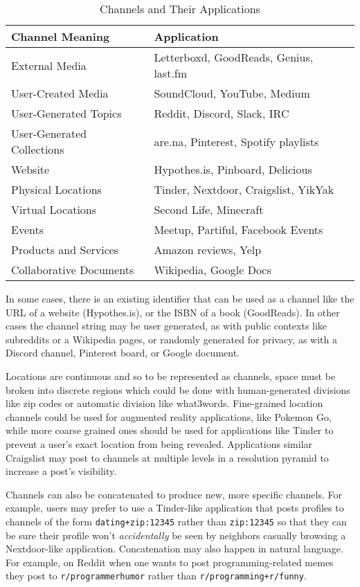 \begin{table}[h]
    \centering
    \begin{tabular}{|l|l|}
        \hline
        \textbf{Channel Meaning} & \textbf{Application} \\ \hline
        External Media & Letterboxd, GoodReads, Genius, last.fm \\ \hline
        User-Created Media & SoundCloud, YouTube, Medium \\ \hline
        User-Generated Topics & Reddit, Discord, Slack, IRC \\ \hline
        User-Generated Collections & are.na, Pinterest, Spotify playlists \\ \hline
        Website & Hypothes.is, Pinboard, Delicious \\ \hline
        Physical Locations & Tinder, Nextdoor, Craigslist, YikYak \\ \hline
        Virtual Locations & Second Life, Minecraft \\ \hline
        Events & Meetup, Partiful, Facebook Events \\ \hline
        Products and Services & Amazon reviews, Yelp \\ \hline
        Collaborative Documents & Wikipedia, Google Docs \\ \hline
    \end{tabular}
    \caption{Channels and Their Applications}
    \label{concepts:tab:channels}
\end{table}

In some cases, there is an existing identifier that can be used as a channel
like the URL of a website (Hypothes.is),
or the ISBN of a book (GoodReads).
In other cases the channel string may be user generated, as with
public contexts like subreddits or a Wikipedia pages,
or randomly generated for privacy, as with
a Discord channel, Pinterest board, or Google document.

Locations are continuous and so to be represented as channels,
space must be broken into discrete regions which could be done with
human-generated divisions like zip codes or automatic division like
what3words. Fine-grained location channels could be used for
augmented reality applications, like Pokemon Go,
while more coarse grained ones should be used for applications like Tinder
to prevent a user's exact location from being revealed.
Applications similar Craigslist may post to channels at multiple levels in
a resolution pyramid to increase a post's visibility.

Channels can also be concatenated to produce new, more specific channels.
For example, users may prefer to use a Tinder-like application that posts
profiles to channels of the form \texttt{dating+zip:12345} rather than
\texttt{zip:12345} so that they can be sure their profile won't
\emph{accidentally} be seen by neighbors casually browsing a Nextdoor-like application.
Concatenation may also happen in natural language.
For example, on Reddit when one wants to post programming-related memes they post to \texttt{r/programmerhumor} rather than \texttt{r/programming+r/funny}.

